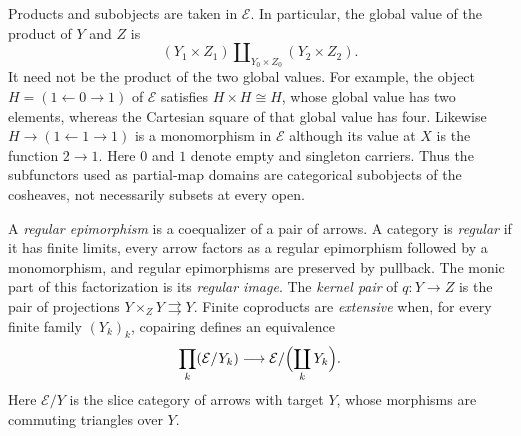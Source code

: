 \documentclass[11pt]{article}
\begin{document}
Products and subobjects are taken in $\mathcal E$. In
particular, the global value of the product of $Y$ and $Z$ is
\[
 (Y_1\times Z_1)\amalg_{Y_0\times Z_0}(Y_2\times Z_2).
\]
It need not be the product of the two global values. For example,
the object $H=(1\leftarrow0\to1)$ of $\mathcal E$ satisfies
$H\times H\cong H$,
whose global value has two elements, whereas the Cartesian square
of that global value has four. Likewise $H\to(1\leftarrow1\to1)$ is a monomorphism
in $\mathcal E$ although its value at $X$ is the function $2\to1$.
Here $0$ and $1$ denote empty and singleton carriers. Thus the
subfunctors used as partial-map domains are categorical subobjects
of the cosheaves, not necessarily subsets at every open.

A \emph{regular epimorphism} is a coequalizer of a pair of arrows.
A category is \emph{regular} if it has finite limits, every arrow
factors as a regular epimorphism followed by a monomorphism, and
regular epimorphisms are preserved by pullback. The monic part of
this factorization is its \emph{regular image}. The \emph{kernel
pair} of $q:Y\to Z$ is the pair of projections
$Y\times_ZY\rightrightarrows Y$.
Finite coproducts are \emph{extensive} when, for every finite family
$(Y_k)_k$, copairing defines an equivalence
\[
 \prod_k(\mathcal E/Y_k)\longrightarrow
 \mathcal E/\Bigl(\coprod_kY_k\Bigr).
\]
Here $\mathcal E/Y$ is the slice category of arrows with target $Y$,
whose morphisms are commuting triangles over $Y$.
\end{document}
